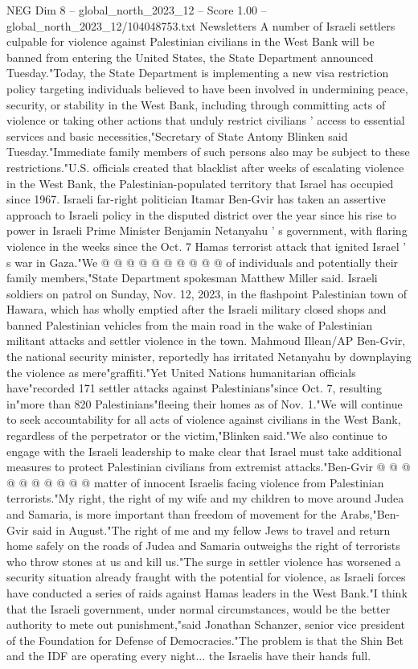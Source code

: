 \begin{textsample}{NEG Dim 8 – global\_north\_2023\_12 – Score 1.00 – global\_north\_2023\_12/104048753.txt}  \label{ex:f8_neg_348}
Newsletters A number of Israeli settlers culpable for violence against Palestinian civilians in the West Bank will be banned from entering the United States, the State Department announced Tuesday."Today, the State Department is implementing a new visa restriction policy targeting individuals believed to have been involved in undermining peace, security, or stability in the West Bank, including through committing acts of violence or taking other actions that unduly restrict civilians ' access to essential services and basic necessities,"Secretary of State Antony Blinken said Tuesday."Immediate family members of such persons also may be subject to these restrictions."U.S. officials created that blacklist after weeks of escalating violence in the West Bank, the Palestinian-populated territory that Israel has occupied since 1967.
Israeli far-right politician Itamar Ben-Gvir has taken an assertive approach to Israeli policy in the disputed district over the year since his rise to power in Israeli Prime Minister Benjamin Netanyahu ' s government, with flaring violence in the weeks since the Oct. 7 Hamas terrorist attack that ignited Israel ' s war in Gaza."We @ @ @ @ @ @ @ @ @ @ of individuals and potentially their family members,"State Department spokesman Matthew Miller said.
Israeli soldiers on patrol on Sunday, Nov. 12, 2023, in the flashpoint Palestinian town of Hawara, which has wholly emptied after the Israeli military closed shops and banned Palestinian vehicles from the main road in the wake of Palestinian militant attacks and settler violence in the town.
Mahmoud Illean/AP Ben-Gvir, the national security minister, reportedly has irritated Netanyahu by downplaying the violence as mere"graffiti."Yet United Nations humanitarian officials have"recorded 171 settler attacks against Palestinians"since Oct. 7, resulting in"more than 820 Palestinians"fleeing their homes as of Nov. 1."We will continue to seek accountability for all acts of violence against civilians in the West Bank, regardless of the perpetrator or the victim,"Blinken said."We also continue to engage with the Israeli leadership to make clear that Israel must take additional measures to protect Palestinian civilians from extremist attacks."Ben-Gvir @ @ @ @ @ @ @ @ @ @ matter of innocent Israelis facing violence from Palestinian terrorists."My right, the right of my wife and my children to move around Judea and Samaria, is more important than freedom of movement for the Arabs,"Ben-Gvir said in August."The right of me and my fellow Jews to travel and return home safely on the roads of Judea and Samaria outweighs the right of terrorists who throw stones at us and kill us."The surge in settler violence has worsened a security situation already fraught with the potential for violence, as Israeli forces have conducted a series of raids against Hamas leaders in the West Bank."I think that the Israeli government, under normal circumstances, would be the better authority to mete out punishment,"said Jonathan Schanzer, senior vice president of the Foundation for Defense of Democracies."The problem is that the Shin Bet and the IDF are operating every night... the Israelis have their hands full.

\end{textsample}
